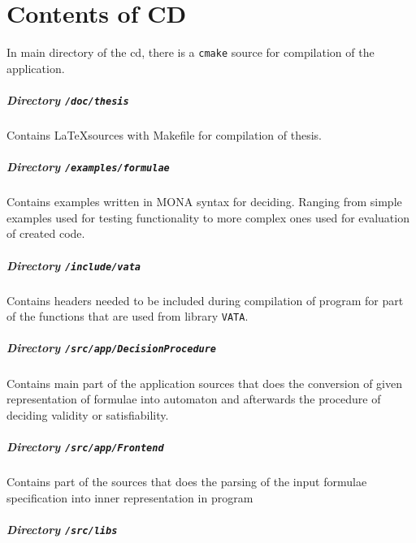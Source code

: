 \chapter{Contents of CD}

In main directory of the cd, there is a \texttt{cmake} source for compilation of
the application.

\paragraph{Directory \texttt{/doc/thesis}}

Contains \LaTeX sources with Makefile for compilation of thesis.

\paragraph{Directory \texttt{/examples/formulae}}

Contains examples written in \textsc{MONA} syntax for deciding. Ranging from
simple examples used for testing functionality to more complex ones used for
evaluation of created code.

\paragraph{Directory \texttt{/include/vata}}

Contains headers needed to be included during compilation of program for part of
the functions that are used from library \texttt{VATA}.

\paragraph{Directory \texttt{/src/app/DecisionProcedure}}

Contains main part of the application sources that does the conversion of given
representation of formulae into automaton and afterwards the procedure of
deciding validity or satisfiability.

\paragraph{Directory \texttt{/src/app/Frontend}}

Contains part of the sources that does the parsing of the input formulae
specification into inner representation in program

\paragraph{Directory \texttt{/src/libs}}

